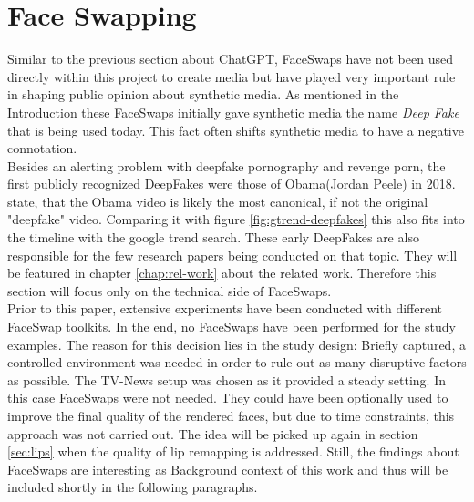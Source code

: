 \documentclass[
  a4paper,  %
  twoside,  %
  bibliography=totoc,
  headsepline,
  cleardoublepage=empty,
  parskip=half,
  draft=false
]{scrbook}
\begin{document}
\section{Face Swapping}
\label{sec:face-swapping}
Similar to the previous section about ChatGPT, FaceSwaps have not been used directly within this project to create media but have played very important rule in shaping public opinion about synthetic media. As mentioned in the Introduction these FaceSwaps initially gave synthetic media the name \textit{Deep Fake} that is being used today. This fact often shifts synthetic media to have a negative connotation. \\
Besides an alerting problem with deepfake pornography and revenge porn, the first publicly recognized DeepFakes were those of Obama(Jordan Peele)\cite{vincentWatchJordanPeele2018} in 2018. \citet{hancockSocialImpactDeepfakes2021} state, that the Obama video is likely the most canonical, if not the original "deepfake" video.
Comparing it with figure \ref{fig:gtrend-deepfakes} this also fits into the timeline with the google trend search. These early DeepFakes are also responsible for the few research papers being conducted on that topic. They will be featured in chapter \ref{chap:rel-work} about the related work. Therefore this section will focus only on the technical side of FaceSwaps. \\
Prior to this paper, extensive experiments have been conducted with different FaceSwap toolkits. In the end, no FaceSwaps have been performed for the study examples. The reason for this decision lies in the study design: Briefly captured, a controlled environment was needed in order to rule out as many disruptive factors as possible. The TV-News setup was chosen as it provided a steady setting. In this case FaceSwaps were not needed. They could have been optionally used to improve the final quality of the rendered faces, but due to time constraints, this approach was not carried out. The idea will be picked up again in section \ref{sec:lips} when the quality of lip remapping is addressed.
Still, the findings about FaceSwaps are interesting as Background context of this work and thus will be included shortly in the following paragraphs.
\end{document}
